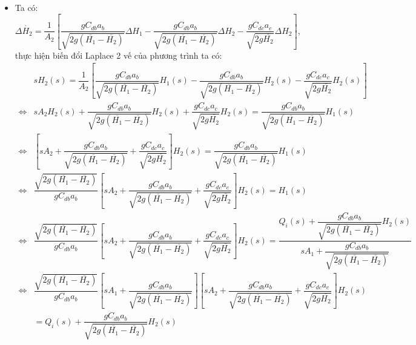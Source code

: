 \begin{enumerate}[\it a.]
\begin{itemize}
                \item Ta có: $\Delta \dot{H_2} = \dfrac{1}{A_2} \left[{\dfrac{g C_{db}a_b}{\sqrt{2g(\overline{H_1} - \overline{H_2})}} \Delta H_1 - \dfrac{g C_{db}a_b}{\sqrt{2g(\overline{H_1} - \overline{H_2})}} \Delta H_2 - \dfrac{g C_{dc}a_c}{\sqrt{2g\overline{H_2}}} \Delta H_2}\right]$, thực hiện biến đổi Laplace 2 vế của phương trình ta có:
                    \begin{align}
                        & s H_2(s) = \dfrac{1}{A_2} \left[{\dfrac{g C_{db}a_b}{\sqrt{2g(\overline{H_1} - \overline{H_2})}} H_1(s) - \dfrac{g C_{db}a_b}{\sqrt{2g(\overline{H_1} - \overline{H_2})}} H_2(s) - \dfrac{g C_{dc}a_c}{\sqrt{2g\overline{H_2}}} H_2(s)}\right] \\
                        \Longleftrightarrow & s A_2 H_2(s) + \dfrac{g C_{db}a_b}{\sqrt{2g(\overline{H_1} - \overline{H_2})}} H_2(s) + \dfrac{g C_{dc}a_c}{\sqrt{2g\overline{H_2}}} H_2(s) = \dfrac{g C_{db}a_b}{\sqrt{2g(\overline{H_1} - \overline{H_2})}} H_1(s) \\
                        \Longleftrightarrow & \left[{s A_2 + \dfrac{g C_{db}a_b}{\sqrt{2g(\overline{H_1} - \overline{H_2})}} + \dfrac{g C_{dc}a_c}{\sqrt{2g\overline{H_2}}}}\right] H_2(s) = \dfrac{g C_{db}a_b}{\sqrt{2g(\overline{H_1} - \overline{H_2})}} H_1(s) \\
                        \Longleftrightarrow & \dfrac{\sqrt{2g(\overline{H_1} - \overline{H_2})}}{g C_{db}a_b} \left[{s A_2 + \dfrac{g C_{db}a_b}{\sqrt{2g(\overline{H_1} - \overline{H_2})}} + \dfrac{g C_{dc}a_c}{\sqrt{2g\overline{H_2}}}}\right] H_2(s) = H_1(s) \\
                        \Longleftrightarrow & \dfrac{\sqrt{2g(\overline{H_1} - \overline{H_2})}}{g C_{db}a_b} \left[{s A_2 + \dfrac{g C_{db}a_b}{\sqrt{2g(\overline{H_1} - \overline{H_2})}} + \dfrac{g C_{dc}a_c}{\sqrt{2g\overline{H_2}}}}\right] H_2(s) = \dfrac{Q_i(s) + \dfrac{gC_{db}a_b}{\sqrt{2g(\overline{H_1} - \overline{H_2})}} H_2(s)}{s A_1 + \dfrac{gC_{db}a_b}{\sqrt{2g(\overline{H_1} - \overline{H_2})}}} \\
                        \Longleftrightarrow & \dfrac{\sqrt{2g(\overline{H_1} - \overline{H_2})}}{g C_{db}a_b} \left[{s A_1 + \dfrac{gC_{db}a_b}{\sqrt{2g(\overline{H_1} - \overline{H_2})}}}\right] \left[{s A_2 + \dfrac{g C_{db}a_b}{\sqrt{2g(\overline{H_1} - \overline{H_2})}} + \dfrac{g C_{dc}a_c}{\sqrt{2g\overline{H_2}}}}\right] H_2(s) \nonumber \\
                        & = Q_i(s) + \dfrac{gC_{db}a_b}{\sqrt{2g(\overline{H_1} - \overline{H_2})}} H_2(s) \\

\end{align}
\end{itemize}
\end{enumerate}
